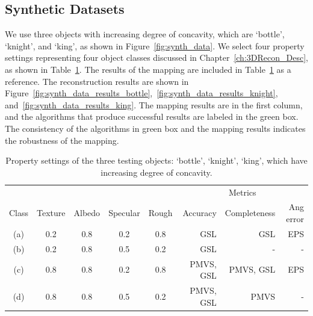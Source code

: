 \subsection{Synthetic Datasets}
We use three objects with increasing degree of concavity, which are `bottle', `knight', and `king', as shown in Figure~\ref{fig:synth_data}. We select four property settings representing four object classes discussed in Chapter~\ref{ch:3DRecon_Desc}, as shown in Table~\ref{tab:prop_list_synth_data}. The results of the mapping are included in Table~\ref{tab:prop_list_synth_data} as a reference. The reconstruction results are shown in Figure~\ref{fig:synth_data_results_bottle},~\ref{fig:synth_data_results_knight}, and~\ref{fig:synth_data_results_king}. The mapping results are in the first column, and the algorithms that produce successful results are labeled in the green box. The consistency of the algorithms in green box and the mapping results indicates the robustness of the mapping.
\begin{table}[!htbp]
  \centering
  \begin{tabular}{*{5}{c}|*{3}{r}}
  \hline
  & & & & & \multicolumn{3}{c}{Metrics}\\
  Class & Texture & Albedo & Specular & Rough & Accuracy & Completeness & Ang error\\
  \hline
  (a) & 0.2 & 0.8 & 0.2 & 0.8 & GSL & GSL & EPS\\
  (b) & 0.2 & 0.8 & 0.5 & 0.2 & GSL & - & - \\
  (c) & 0.8 & 0.8 & 0.2 & 0.8 & PMVS, GSL & PMVS, GSL & EPS \\
  (d) & 0.8 & 0.8 & 0.5 & 0.2 & PMVS, GSL & PMVS & -\\
  \hline
  \end{tabular}
  \caption{Property settings of the three testing objects: `bottle', `knight', `king', which have increasing degree of concavity.}
  \label{tab:prop_list_synth_data}
\end{table}

